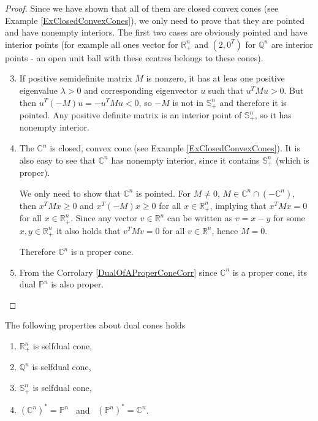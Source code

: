 \documentclass[12pt]{book}
\theoremstyle{definition}
\begin{document}
\begin{appendix}
\begin{proof} Since we have shown that all of them are closed convex cones (see Example \ref{ExClosedConvexCones}), we only need to prove that they are pointed and have nonempty interiors.
The first two cases are obviously pointed and have interior points (for example all ones vector for $\mathbb{R}^n_+$ and $(2,0^T)$ for $\mathbb{Q}^n$ are interior points - an open unit ball with these centres belongs to these cones). 
\begin{enumerate}
\setcounter{enumi}{2}
\item If positive semidefinite matrix $M$ is nonzero, it has at leas one positive eigenvalue $\lambda >0$ and corresponding eigenvector $u$ such that $u^TMu>0$. But then $u^T(-M)u = - u^TMu<0$, so $-M$ is not in $\mathbb{S}^n_+$ and therefore it is pointed. Any positive definite matrix is an interior point of $\mathbb{S}^n_+$, so it has nonempty interior. 

\item The $\mathbb{C}^n$ is closed, convex cone (see Example \ref{ExClosedConvexCones}). It is also easy to see that $\mathbb{C}^n$ has nonempty interior, since it contains $\mathbb{S}^n_+$ (which is proper).

We only need to show that $\mathbb{C}^n$ is pointed. For $M\neq 0$, $M\in\mathbb{C}^n\cap (-\mathbb{C}^n)$, 
then $x^TMx\geq 0$ and $x^T(-M)x\geq 0$ for all $x\in\mathbb{R}^n_+$, implying that 
$x^TMx=0$ for all $x\in\mathbb{R}^n_+$. Since any vector $v\in \mathbb{R}^n$ can be written as $v = x - y$ for some $x,y\in\mathbb{R}^n_+$ it also holds that $v^TMv=0$ for all $v\in\mathbb{R}^n$, hence $M=0$.

Therefore $\mathbb{C}^n$ is a proper cone. 

\item From the Corrolary \ref{DualOfAProperConeCorr} since $\mathbb{C}^n$ is a proper cone, its dual $\mathbb{P}^n$ is also proper.
\end{enumerate}
\end{proof}

 The following properties about dual cones holds
\label{ExDualCones}
\begin{enumerate}
\item $\mathbb{R}^n_+$ is selfdual cone,
\item $\mathbb{Q}^n$ is selfdual cone,
\item $\mathbb{S}^n_+$ is selfdual cone,
\item $(\mathbb{C}^n)^* = \mathbb{P}^{n}$ \ and \ $(\mathbb{P}^n)^* = \mathbb{C}^{n}$. 
\end{enumerate}


\end{appendix}
\end{document}
